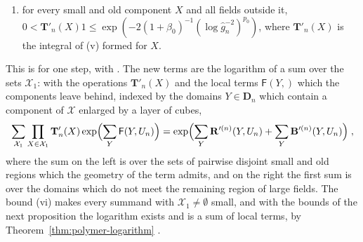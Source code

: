 \documentclass[11pt]{preprint}
\makeatletter
\newcommand*{\bigcdot}{}%
\DeclareRobustCommand*{\bigcdot}{%
	\mathbin{\mathpalette\bigcdot@{}}%
}
\newcommand*{\bigcdot@scalefactor}{.7}
\newcommand*{\bigcdot@widthfactor}{1.15}
\newcommand*{\bigcdot@}[2]{%
	\sbox0{$#1\vcenter{}$}%
	\sbox2{$#1\cdot\m@th$}%
	\hbox to \bigcdot@widthfactor\wd2{%
		\hss
		\raise\ht0\hbox{%
			\scalebox{\bigcdot@scalefactor}{%
				\lower\ht0\hbox{$#1\bullet\m@th$}%
			}%
		}%
		\hss
	}%
}
\numberwithin{equation}{section}
\makeatother
\begin{document}
\begin{theorem}
\begin{enumerate}[label=(\roman*)]
\item for every small and old component $X$ and all fields outside it, $0 < \mathbf T'_n(X)1 \leqslant \exp(-2(1 + \beta_0)^{-1}(\log\hat g_n^{-2})^{p_0})$, where $\mathbf T'_n(X)$ is the integral of (v) formed for $X$.
\end{enumerate}
\end{theorem}

This is \cite[Theorem~1, p.~355]{BalabanLFR2} for one step, with \cite[(1.70)--(1.72), (1.89), (1.98)--(1.102)]{BalabanLFR2}. The new terms are the logarithm of a sum over the sets $\mathcal X_1$: with the operations $\mathbf T'_n(X)$ and the local terms $\mathsf F(Y,\bigcdot)$ which the components leave behind, indexed by the domains $Y \in \mathbf D_n$ which contain a component of $\mathcal X$ enlarged by a layer of cubes,
\begin{equation}\label{eq:r-exponentiation}
    \sum_{\mathcal X_1}\prod_{X \in \mathcal X_1}\mathbf T'_n(X)\exp\Bigl(\sum_Y\mathsf F(Y,U_n)\Bigr) = \exp\Bigl(\sum_{Y}\mathbf R'^{(n)}(Y, U_n) + \sum_Y\mathbf B'^{(n)}(Y, U_n)\Bigr)\;,
\end{equation}
where the sum on the left is over the sets of pairwise disjoint small and old regions which the geometry of the term admits, and on the right the first sum is over the domains which do not meet the remaining region of large fields. The bound (vi) makes every summand with $\mathcal X_1 \neq \emptyset$ small, and with the bounds of the next proposition the logarithm exists and is a sum of local terms, by Theorem~\ref{thm:polymer-logarithm} \cite[(1.90)--(1.100)]{BalabanLFR2}.
\end{document}
